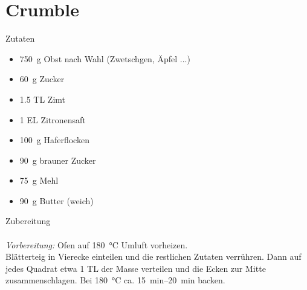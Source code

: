 \section*{Crumble}
\ihead{}\ohead{}
\cfoot{}
{\Large Zutaten}
\begin{multicols}{2}
\begin{itemize}
    \item \SI{750}{g} Obst nach Wahl (Zwetschgen, Äpfel ...)
    \item \SI{60}{g} Zucker
    \item \num{1.5} TL Zimt
    \item \num{1} EL Zitronensaft
    \item \SI{100}{g} Haferflocken
    \item \SI{90}{g} brauner Zucker
    \item \SI{75}{g} Mehl
    \item \SI{90}{g} Butter (weich)
\end{itemize}
\end{multicols}
\noindent
{\Large Zubereitung}\\
\\
\textit{Vorbereitung:} Ofen auf \SI{180}{\celsius} Umluft vorheizen.\\
Blätterteig in Vierecke einteilen und die restlichen Zutaten verrühren. 
Dann auf jedes Quadrat etwa \num{1} TL der Masse verteilen und die Ecken zur Mitte zusammenschlagen.
Bei \SI{180}{\celsius} ca. \SIrange{15}{20}{min} backen.